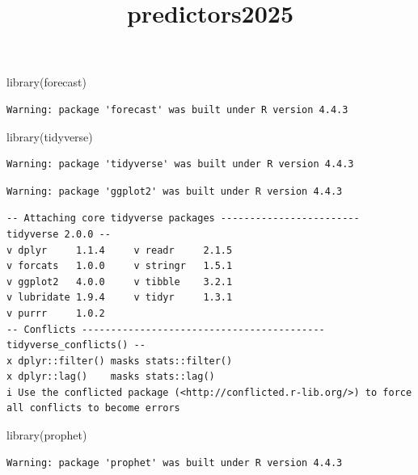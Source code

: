 \documentclass[
  letterpaper,
  DIV=11,
  numbers=noendperiod]{scrartcl}
\title{predictors2025}
\author{}
\date{}
\newenvironment{Shaded}{\begin{snugshade}}{\end{snugshade}}
\newcommand{\FunctionTok}[1]{\textcolor[rgb]{0.28,0.35,0.67}{#1}}
\newcommand{\NormalTok}[1]{\textcolor[rgb]{0.00,0.23,0.31}{#1}}
\begin{document}
\maketitle


\begin{Shaded}
\begin{Highlighting}[]
\FunctionTok{library}\NormalTok{(forecast)}
\end{Highlighting}
\end{Shaded}

\begin{verbatim}
Warning: package 'forecast' was built under R version 4.4.3
\end{verbatim}

\begin{Shaded}
\begin{Highlighting}[]
\FunctionTok{library}\NormalTok{(tidyverse)}
\end{Highlighting}
\end{Shaded}

\begin{verbatim}
Warning: package 'tidyverse' was built under R version 4.4.3
\end{verbatim}

\begin{verbatim}
Warning: package 'ggplot2' was built under R version 4.4.3
\end{verbatim}

\begin{verbatim}
-- Attaching core tidyverse packages ------------------------ tidyverse 2.0.0 --
v dplyr     1.1.4     v readr     2.1.5
v forcats   1.0.0     v stringr   1.5.1
v ggplot2   4.0.0     v tibble    3.2.1
v lubridate 1.9.4     v tidyr     1.3.1
v purrr     1.0.2     
-- Conflicts ------------------------------------------ tidyverse_conflicts() --
x dplyr::filter() masks stats::filter()
x dplyr::lag()    masks stats::lag()
i Use the conflicted package (<http://conflicted.r-lib.org/>) to force all conflicts to become errors
\end{verbatim}

\begin{Shaded}
\begin{Highlighting}[]
\FunctionTok{library}\NormalTok{(prophet)}
\end{Highlighting}
\end{Shaded}

\begin{verbatim}
Warning: package 'prophet' was built under R version 4.4.3
\end{verbatim}
\end{document}

